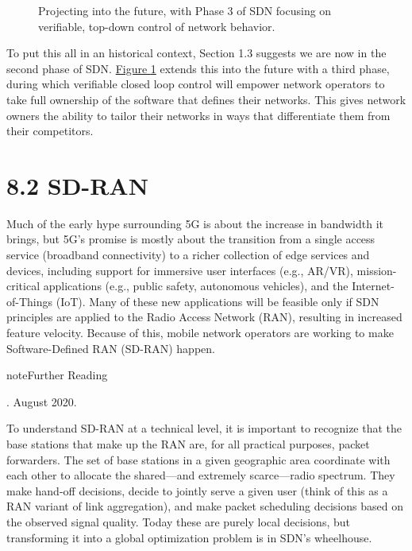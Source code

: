 \documentclass[letterpaper,11pt,english]{sphinxmanual}
\let\sphinxpxdimen\pdfpxdimen\else\newdimen\sphinxpxdimen
\begin{document}
\begin{figure}[htbp]
\centering
\capstart

\noindent\sphinxincludegraphics[width=600\sphinxpxdimen]{{Slide37}.png}
\caption{Projecting into the future, with Phase 3 of SDN focusing on
verifiable, top-down control of network behavior.}\label{\detokenize{future:id5}}\label{\detokenize{future:fig-phase3}}\end{figure}

To put this all in an historical context, Section 1.3 suggests we are
now in the second phase of SDN. \hyperref[\detokenize{future:fig-phase3}]{Figure \ref{\detokenize{future:fig-phase3}}}
extends this into the future with a third phase, during which
verifiable closed loop control will empower network operators to take
full ownership of the software that defines their networks. This gives
network owners the ability to tailor their networks in ways that
differentiate them from their competitors.


\section{8.2 SD-RAN}
\label{\detokenize{future:sd-ran}}
Much of the early hype surrounding 5G is about the increase in
bandwidth it brings, but 5G’s promise is mostly about the transition
from a single access service (broadband connectivity) to a richer
collection of edge services and devices, including support for
immersive user interfaces (e.g., AR/VR), mission-critical applications
(e.g., public safety, autonomous vehicles), and the Internet-of-Things
(IoT). Many of these new applications will be feasible only if SDN
principles are applied to the Radio Access Network (RAN), resulting in
increased feature velocity. Because of this, mobile network operators
are working to make Software-Defined RAN (SD-RAN) happen.

\label{\detokenize{future:reading-5g}}
\begin{sphinxadmonition}{note}{Further Reading}

. August 2020.
\end{sphinxadmonition}

To understand SD-RAN at a technical level, it is important to
recognize that the base stations that make up the RAN are, for all
practical purposes, packet forwarders. The set of base stations in a
given geographic area coordinate with each other to allocate the
shared—and extremely scarce—radio spectrum. They make hand-off
decisions, decide to jointly serve a given user (think of this as a
RAN variant of link aggregation), and make packet scheduling decisions
based on the observed signal quality. Today these are purely local
decisions, but transforming it into a global optimization problem is
in SDN’s wheelhouse.
\end{document}
